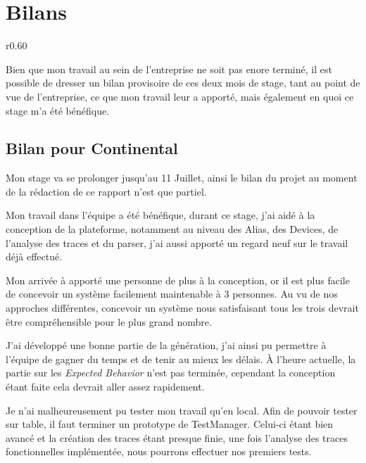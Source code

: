 \chapter{Bilans}
\begin{wrapfigure}{r}{0.60\textwidth}
\vspace{-25px}
\hspace{-30px}
\begin{minipage}{0.67\textwidth}
\minitoc
\end{minipage}
\end{wrapfigure}

Bien que mon travail au sein de l'entreprise ne soit pas enore terminé, il est possible de dresser un bilan provisoire de ces deux mois de stage, tant au point de vue de l'entreprise, ce que mon travail leur a apporté, mais également en quoi ce stage m'a été bénéfique.

	\section{Bilan pour Continental}
	Mon stage va se prolonger jusqu'au 11 Juillet, ainsi le bilan du projet au moment de la rédaction de ce rapport n'est que partiel. 

	Mon travail dans l'équipe a été bénéfique, durant ce stage, j'ai aidé à la conception de la plateforme, notamment au niveau des Alias, des Devices, de l'analyse des traces et du parser,	j'ai aussi apporté un regard neuf sur le travail déjà effectué.

	Mon arrivée à apporté une personne de plus à la conception, or il est plus facile de concevoir un système facilement maintenable à 3 personnes. Au vu de nos
	approches différentes, concevoir un système nous satisfaisant tous les trois devrait être compréhensible pour le plus grand nombre.
	
	J'ai développé une bonne partie de la génération, j'ai ainsi pu permettre à l'équipe de gagner du temps et de
	tenir au mieux les délais. À l'heure actuelle, la partie sur les \textit{Expected Behavior} n'est pas terminée, cependant la conception étant faite cela devrait aller
	assez rapidement.
	
	Je n'ai malheureusement pu tester mon travail qu'en local. Afin de pouvoir tester sur table, il faut terminer un prototype de TestManager. Celui-ci étant bien
	avancé et la création des traces étant presque finie, une fois l'analyse des traces fonctionnelles implémentée, nous pourrons effectuer nos premiers tests.

